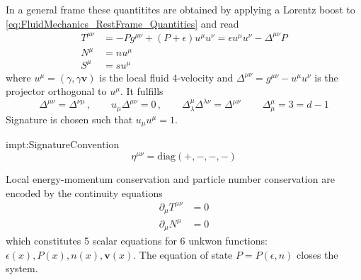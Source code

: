 In a general frame these quantitites are obtained by applying a Lorentz boost to \eqref{eq:FluidMechanics_RestFrame_Quantities} and read \cite{Rischke_2022}
\begin{subequations}
    \begin{align}
        T^{\mu\nu} & =-Pg^{\mu\nu}+(P+\epsilon)u^\mu u^\nu=\epsilon u^\mu u^\nu-\Delta^{\mu\nu}P \\
        N^\mu      & =nu^\mu                                                                     \\
        S^\mu      & =su^\mu
    \end{align}
\end{subequations}
where $u^\mu=(\gamma,\gamma\mathbf{v})$ is the local fluid 4-velocity and $\Delta^{\mu\nu}=g^{\mu\nu}-u^\mu u^\nu$ is the projector orthogonal to $u^\mu$. It fulfills
\begin{equation}
    \Delta^{\mu\nu}=\Delta^{\nu\mu}\,,\qquad u_\mu\Delta^{\mu\nu}=0\,,\qquad\Delta^\mu_\lambda\Delta^{\lambda\nu}=\Delta^{\mu\nu}\,\qquad\Delta^\mu_\mu=3=d-1
    \label{eq:FluidMechanics_ProjProperties}
\end{equation}
Signature is chosen such that $u_\mu u^\mu=1$.
\begin{impt}{impt:SignatureConvention}
    \begin{equation*}
        \eta^{\mu\nu}=\text{diag}(+,-,-,-)
    \end{equation*}
\end{impt}

Local energy-momentum conservation and particle number conservation are encoded by the continuity equations
\begin{subequations}
    \begin{align}
        \partial_\mu T^{\mu\nu} & =0 \label{eq:FluidMechanics_EnMomTens_Conservation}  \\
        \partial_\mu N^\mu      & =0 \label{eq:FluidMechanics_PartNumCur_Conservation}
    \end{align}
\end{subequations}
which constitutes 5 scalar equations for 6 unkwon functions: $\epsilon(x), P(x), n(x), \mathbf{v}(x)$. The equation of state $P=P(\epsilon,n)$ closes the system.

